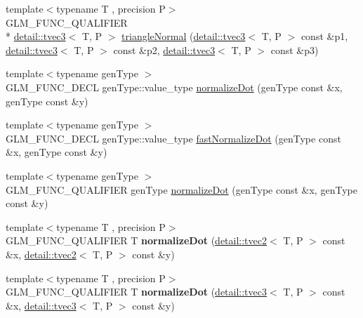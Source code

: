 \begin{DoxyCompactItemize}
\item 
{\footnotesize template$<$typename T , precision P$>$ }\\G\-L\-M\-\_\-\-F\-U\-N\-C\-\_\-\-Q\-U\-A\-L\-I\-F\-I\-E\-R \\*
\hyperlink{structglm_1_1detail_1_1tvec3}{detail\-::tvec3}$<$ T, P $>$ \hyperlink{group__gtx__normal_gadd95b70793270eaeec13e2e8788b71d2}{triangle\-Normal} (\hyperlink{structglm_1_1detail_1_1tvec3}{detail\-::tvec3}$<$ T, P $>$ const \&p1, \hyperlink{structglm_1_1detail_1_1tvec3}{detail\-::tvec3}$<$ T, P $>$ const \&p2, \hyperlink{structglm_1_1detail_1_1tvec3}{detail\-::tvec3}$<$ T, P $>$ const \&p3)
\item 
{\footnotesize template$<$typename gen\-Type $>$ }\\G\-L\-M\-\_\-\-F\-U\-N\-C\-\_\-\-D\-E\-C\-L gen\-Type\-::value\-\_\-type \hyperlink{group__gtx__normalize__dot_ga13b81f0882c1811cb6c99a5864b9c152}{normalize\-Dot} (gen\-Type const \&x, gen\-Type const \&y)
\item 
{\footnotesize template$<$typename gen\-Type $>$ }\\G\-L\-M\-\_\-\-F\-U\-N\-C\-\_\-\-D\-E\-C\-L gen\-Type\-::value\-\_\-type \hyperlink{group__gtx__normalize__dot_gaeb26ec35a51c30dbd0d91f9da45eeafe}{fast\-Normalize\-Dot} (gen\-Type const \&x, gen\-Type const \&y)
\item 
{\footnotesize template$<$typename gen\-Type $>$ }\\G\-L\-M\-\_\-\-F\-U\-N\-C\-\_\-\-Q\-U\-A\-L\-I\-F\-I\-E\-R gen\-Type \hyperlink{group__gtx__normalize__dot_ga13b81f0882c1811cb6c99a5864b9c152}{normalize\-Dot} (gen\-Type const \&x, gen\-Type const \&y)
\item 
\hypertarget{namespaceglm_a57fabe89311600d86b489bf9d2ebdd67}{{\footnotesize template$<$typename T , precision P$>$ }\\G\-L\-M\-\_\-\-F\-U\-N\-C\-\_\-\-Q\-U\-A\-L\-I\-F\-I\-E\-R T {\bfseries normalize\-Dot} (\hyperlink{structglm_1_1detail_1_1tvec2}{detail\-::tvec2}$<$ T, P $>$ const \&x, \hyperlink{structglm_1_1detail_1_1tvec2}{detail\-::tvec2}$<$ T, P $>$ const \&y)}\label{namespaceglm_a57fabe89311600d86b489bf9d2ebdd67}

\item 
\hypertarget{namespaceglm_ace07e8c0834217ad8e5e025247f17df5}{{\footnotesize template$<$typename T , precision P$>$ }\\G\-L\-M\-\_\-\-F\-U\-N\-C\-\_\-\-Q\-U\-A\-L\-I\-F\-I\-E\-R T {\bfseries normalize\-Dot} (\hyperlink{structglm_1_1detail_1_1tvec3}{detail\-::tvec3}$<$ T, P $>$ const \&x, \hyperlink{structglm_1_1detail_1_1tvec3}{detail\-::tvec3}$<$ T, P $>$ const \&y)}\label{namespaceglm_ace07e8c0834217ad8e5e025247f17df5}


\end{DoxyCompactItemize}
